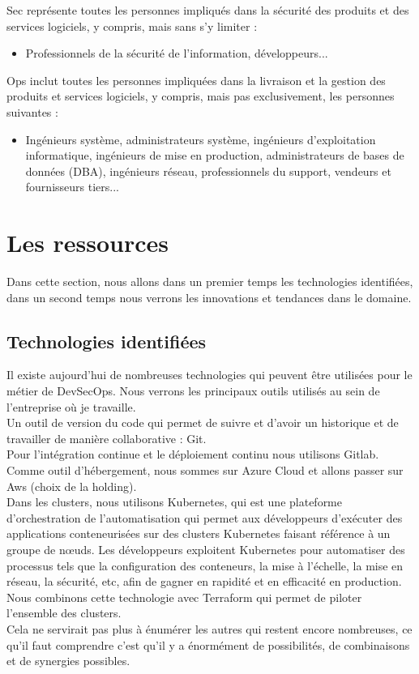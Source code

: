 \documentclass[11pt,a4paper,oneside]{book}
\begin{document}
Sec représente toutes les personnes impliqués dans la sécurité des produits et des services logiciels, y compris, mais sans s'y limiter : \\
\begin{itemize}
\item Professionnels de la sécurité de l'information, développeurs...
\end{itemize}

Ops inclut toutes les personnes impliquées dans la livraison et la gestion des produits et services logiciels, y compris, mais pas exclusivement, les personnes suivantes : \\
\begin{itemize}
\item Ingénieurs système, administrateurs système, ingénieurs d'exploitation informatique, ingénieurs de mise en production, administrateurs de bases de données (DBA), ingénieurs réseau, professionnels du support, vendeurs et fournisseurs tiers...
\end{itemize}

\newpage

\section{Les ressources}

Dans cette section, nous allons dans un premier temps les technologies identifiées, dans un second temps nous verrons les innovations et tendances dans le domaine.

\subsection{Technologies identifiées}

Il existe aujourd'hui de nombreuses technologies qui peuvent être utilisées pour le métier de DevSecOps.
Nous verrons les principaux outils utilisés au sein de l'entreprise où je travaille. \\
Un outil de version du code qui permet de suivre et d'avoir un historique et de travailler de manière collaborative : Git. \\
Pour l'intégration continue et le déploiement continu nous utilisons Gitlab. \\
Comme outil d'hébergement, nous sommes sur Azure Cloud et allons passer sur Aws (choix de la holding). \\
Dans les clusters, nous utilisons Kubernetes, qui est une plateforme d'orchestration de l'automatisation qui permet aux développeurs d'exécuter des applications conteneurisées sur des clusters Kubernetes faisant référence à un groupe de nœuds. Les développeurs exploitent Kubernetes pour automatiser des processus tels que la configuration des conteneurs, la mise à l'échelle, la mise en réseau, la sécurité, etc, afin de gagner en rapidité et en efficacité en production. \\
Nous combinons cette technologie avec Terraform qui permet de piloter l'ensemble des clusters. \\
Cela ne servirait pas plus à énumérer les autres qui restent encore nombreuses, ce qu'il faut comprendre c'est qu'il y a énormément de possibilités, de combinaisons et de synergies possibles.
\end{document}

